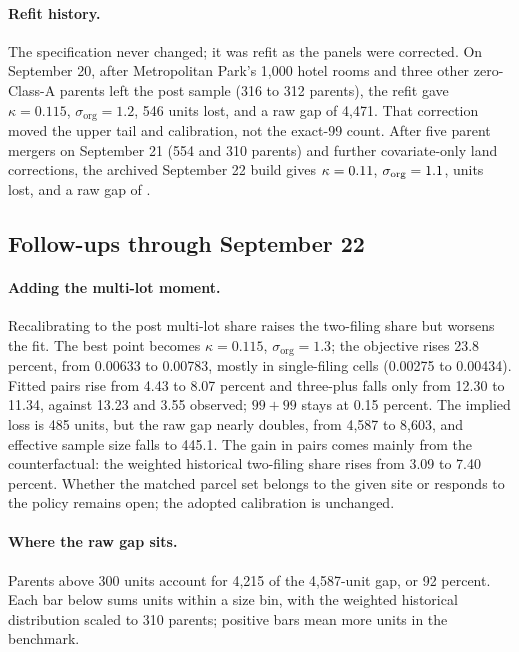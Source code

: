 \paragraph{Refit history.} The specification never changed; it was refit as
the panels were corrected. On September 20, after Metropolitan Park's 1,000
hotel rooms and three other zero-Class-A parents left the post sample (316 to
312 parents), the refit gave $\kappa=0.115$, $\sigma_{\mathrm{org}}=1.2$, 546
units lost, and a raw gap of 4,471. That correction moved the upper tail and
calibration, not the exact-99 count. After five parent mergers on September
21 (554 and 310 parents) and further covariate-only land corrections, the
archived September 22 build gives $\kappa=0.11$,
$\sigma_{\mathrm{org}}=1.1$, \NotchUnitLoss{} units lost, and a raw
gap of \NotchDirectGap.

\subsection*{Follow-ups through September 22}

\paragraph{Adding the multi-lot moment.} Recalibrating to the post multi-lot
share raises the two-filing share but worsens the fit. The best point becomes
$\kappa=0.115$, $\sigma_{\mathrm{org}}=1.3$; the objective rises 23.8 percent,
from 0.00633 to 0.00783, mostly in single-filing cells (0.00275 to 0.00434).
Fitted pairs rise from 4.43 to 8.07 percent and three-plus falls only from
12.30 to 11.34, against 13.23 and 3.55 observed; $99+99$ stays at 0.15
percent. The implied loss is 485 units, but the raw gap nearly doubles, from
4,587 to 8,603, and effective sample size falls to 445.1. The gain in pairs
comes mainly from the counterfactual: the weighted historical two-filing share
rises from 3.09 to 7.40 percent. Whether the matched parcel set belongs to the
given site or responds to the policy remains open; the adopted calibration is
unchanged.

\paragraph{Where the raw gap sits.} Parents above 300 units account for 4,215
of the 4,587-unit gap, or 92 percent. Each bar below sums units within a size
bin, with the weighted historical distribution scaled to 310 parents; positive
bars mean more units in the benchmark.

